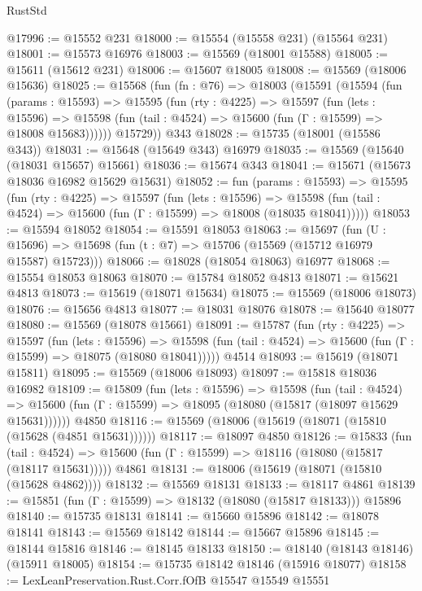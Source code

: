 \begin{lexlean}{RustStd}
\begin{coremodule}
@17996 := @15552 @231
@18000 := @15554 (@15558 @231) (@15564 @231)
@18001 := @15573 @16976
@18003 := @15569 (@18001 @15588)
@18005 := @15611 (@15612 @231)
@18006 := @15607 @18005
@18008 := @15569 (@18006 @15636)
@18025 := @15568
    (fun (fn : @76) =>
    @18003
      (@15591
        (@15594
          (fun (params : @15593) =>
          @15595
            (fun (rty : @4225) =>
            @15597
              (fun (lets : @15596) =>
              @15598 (fun (tail : @4524) => @15600 (fun (Γ : @15599) => @18008 @15683))))))
        @15729))
    @343
@18028 := @15735 (@18001 (@15586 @343))
@18031 := @15648 (@15649 @343) @16979
@18035 := @15569 (@15640 (@18031 @15657) @15661)
@18036 := @15674 @343
@18041 := @15671 (@15673 @18036 @16982 @15629 @15631)
@18052 := fun (params : @15593) =>
  @15595
    (fun (rty : @4225) =>
    @15597
      (fun (lets : @15596) =>
      @15598 (fun (tail : @4524) => @15600 (fun (Γ : @15599) => @18008 (@18035 @18041)))))
@18053 := @15594 @18052
@18054 := @15591 @18053
@18063 := @15697
    (fun (U : @15696) => @15698 (fun (t : @7) => @15706 (@15569 (@15712 @16979 @15587) @15723)))
@18066 := @18028 (@18054 @18063) @16977
@18068 := @15554 @18053 @18063
@18070 := @15784 @18052 @4813
@18071 := @15621 @4813
@18073 := @15619 (@18071 @15634)
@18075 := @15569 (@18006 @18073)
@18076 := @15656 @4813
@18077 := @18031 @18076
@18078 := @15640 @18077
@18080 := @15569 (@18078 @15661)
@18091 := @15787
    (fun (rty : @4225) =>
    @15597
      (fun (lets : @15596) =>
      @15598 (fun (tail : @4524) => @15600 (fun (Γ : @15599) => @18075 (@18080 @18041)))))
    @4514
@18093 := @15619 (@18071 @15811)
@18095 := @15569 (@18006 @18093)
@18097 := @15818 @18036 @16982
@18109 := @15809
    (fun (lets : @15596) =>
    @15598
      (fun (tail : @4524) =>
      @15600 (fun (Γ : @15599) => @18095 (@18080 (@15817 (@18097 @15629 @15631))))))
    @4850
@18116 := @15569 (@18006 (@15619 (@18071 (@15810 (@15628 (@4851 @15631))))))
@18117 := @18097 @4850
@18126 := @15833
    (fun (tail : @4524) => @15600 (fun (Γ : @15599) => @18116 (@18080 (@15817 (@18117 @15631)))))
    @4861
@18131 := @18006 (@15619 (@18071 (@15810 (@15628 @4862))))
@18132 := @15569 @18131
@18133 := @18117 @4861
@18139 := @15851 (fun (Γ : @15599) => @18132 (@18080 (@15817 @18133))) @15896
@18140 := @15735 @18131
@18141 := @15660 @15896
@18142 := @18078 @18141
@18143 := @15569 @18142
@18144 := @15667 @15896
@18145 := @18144 @15816
@18146 := @18145 @18133
@18150 := @18140 (@18143 @18146) (@15911 @18005)
@18154 := @15735 @18142 @18146 (@15916 @18077)
@18158 := LexLeanPreservation.Rust.Corr.fOfB @15547 @15549 @15551

\end{coremodule}
\end{lexlean}
